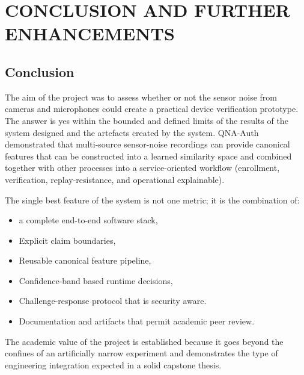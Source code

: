 \chapter{\MakeUppercase{Conclusion and Further enhancements}}
\justifying
\section{Conclusion}
The aim of the project was to assess whether or not the sensor noise from cameras and microphones could create a practical device verification prototype. The answer is yes within the bounded and defined limits of the results of the system designed and the artefacts created by the system. QNA-Auth demonstrated that multi-source sensor-noise recordings can provide canonical features that can be constructed into a learned similarity space and combined together with other processes into a service-oriented workflow (enrollment, verification, replay-resistance, and operational explainable).

The single best feature of the system is not one metric; it is the combination of:
\begin{itemize}
	\item a complete end-to-end software stack,
	\item Explicit claim boundaries,
	\item Reusable canonical feature pipeline,
	\item Confidence-band based runtime decisions,
	\item Challenge-response protocol that is security aware.
	\item Documentation and artifacts that permit academic peer review.
\end{itemize}

The academic value of the project is established because it goes beyond the confines of an artificially narrow experiment and demonstrates the type of engineering integration expected in a solid capstone thesis.

